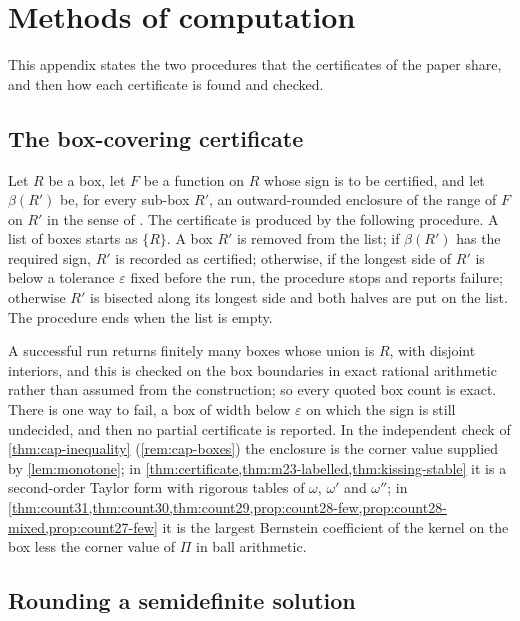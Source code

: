 \documentclass[11pt,reqno]{amsart}
\renewcommand{\_}{\origunderscore\allowbreak}
\numberwithin{equation}{section}
\theoremstyle{plain}
\theoremstyle{definition}
\theoremstyle{remark}
\begin{document}
\section{Methods of computation}\label{app:code-index}

This appendix states the two procedures that the certificates of the paper
share, and then how each certificate is found and checked.

\subsection*{The box-covering certificate}\label{app:box-cover-algo}

Let $R$ be a box, let $F$ be a function on $R$ whose sign is to be
certified, and let $\beta(R')$ be, for every sub-box $R'$, an
outward-rounded enclosure of the range of $F$ on $R'$ in the sense of
\cite[Ch.~5]{MKC09}. The certificate is produced by the following
procedure. A list of boxes starts as $\{R\}$. A box $R'$ is removed from
the list; if $\beta(R')$ has the required sign, $R'$ is recorded as
certified; otherwise, if the longest side of $R'$ is below a tolerance
$\varepsilon$ fixed before the run, the procedure stops and reports
failure; otherwise $R'$ is bisected along its longest side and both halves
are put on the list. The procedure ends when the list is empty.

A successful run returns finitely many boxes whose union is $R$, with
disjoint interiors, and this is checked on the box boundaries in exact
rational arithmetic rather than assumed from the construction; so every
quoted box count is exact. There is one way to fail, a box of width below
$\varepsilon$ on which the sign is still undecided, and then no partial
certificate is reported. In the independent check of \cref{thm:cap-inequality}
(\cref{rem:cap-boxes}) the enclosure is the corner value supplied by
\cref{lem:monotone}; in
\cref{thm:certificate,thm:m23-labelled,thm:kissing-stable} it is a
second-order Taylor form with rigorous tables of $\omega$, $\omega'$ and
$\omega''$; in \cref{thm:count31,thm:count30,thm:count29,prop:count28-few,prop:count28-mixed,prop:count27-few} it is the largest Bernstein
coefficient \cite{Far12} of the kernel on the box less the corner value of
$\Pi$ in ball arithmetic.

\subsection*{Rounding a semidefinite solution}
\end{document}
